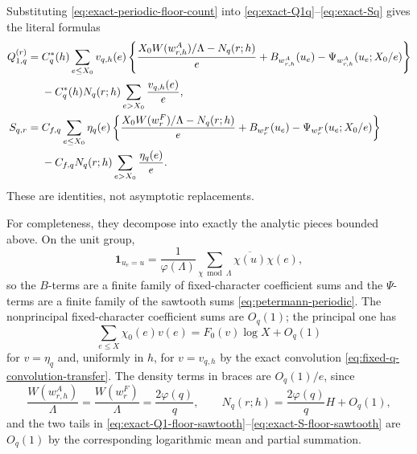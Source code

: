 \documentclass[11pt]{article}
\theoremstyle{definition}
\theoremstyle{remark}
\newcommand{\1}{\mathbf 1}
\newcommand{\ph}{\varphi}
\begin{document}
Substituting \eqref{eq:exact-periodic-floor-count} into
\eqref{eq:exact-Q1q}--\eqref{eq:exact-Sq} gives the literal formulas
\begin{align}
Q_{1,q}^{(r)}
={}&C_q^*(h)\sum_{e\le X_0}v_{q,h}(e)
\left\{
\frac{X_0W(w^A_{r,h})/\Lambda-N_q(r;h)}e
+B_{w^A_{r,h}}(u_e)-\Psi_{w^A_{r,h}}(u_e;X_0/e)
\right\}\notag\\
&-C_q^*(h)N_q(r;h)\sum_{e>X_0}\frac{v_{q,h}(e)}e,
\label{eq:exact-Q1-floor-sawtooth}\\
S_{q,r}
={}&C_{f,q}\sum_{e\le X_0}\eta_q(e)
\left\{
\frac{X_0W(w^F_r)/\Lambda-N_q(r;h)}e
+B_{w^F_r}(u_e)-\Psi_{w^F_r}(u_e;X_0/e)
\right\}\notag\\
&-C_{f,q}N_q(r;h)\sum_{e>X_0}\frac{\eta_q(e)}e.
\label{eq:exact-S-floor-sawtooth}
\end{align}
These are identities, not asymptotic replacements.

For completeness, they decompose into exactly the analytic pieces bounded
above.  On the unit group,
\[
\1_{u_e=u}=\frac1{\ph(\Lambda)}
\sum_{\chi\bmod\Lambda}\overline{\chi(u)}\chi(e),
\]
so the $B$-terms are a finite family of fixed-character coefficient sums and
the $\Psi$-terms are a finite family of the sawtooth sums
\eqref{eq:petermann-periodic}.  The nonprincipal fixed-character coefficient
sums are $O_q(1)$; the principal one has
\[
\sum_{e\le X}\chi_0(e)v(e)=F_0(v)\log X+O_q(1)
\]
for $v=\eta_q$ and, uniformly in $h$, for $v=v_{q,h}$ by the exact convolution
\eqref{eq:fixed-q-convolution-transfer}.  The density terms in braces are
$O_q(1)/e$, since
\[
\frac{W(w^A_{r,h})}{\Lambda}
=\frac{W(w^F_r)}{\Lambda}=\frac{2\ph(q)}q,
\qquad
N_q(r;h)=\frac{2\ph(q)}qH+O_q(1),
\]
and the two tails in
\eqref{eq:exact-Q1-floor-sawtooth}--\eqref{eq:exact-S-floor-sawtooth} are
$O_q(1)$ by the corresponding logarithmic mean and partial summation.
\end{document}
